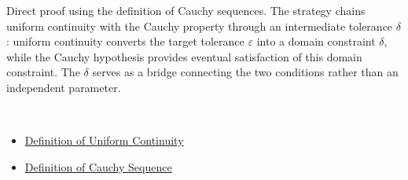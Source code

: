 \begin{remark*}
Direct proof using the definition of Cauchy sequences. The strategy chains uniform continuity with the Cauchy property through an intermediate tolerance $\delta$: uniform continuity converts the target tolerance $\varepsilon$ into a domain constraint $\delta$, while the Cauchy hypothesis provides eventual satisfaction of this domain constraint. The $\delta$ serves as a bridge connecting the two conditions rather than an independent parameter.
\end{remark*}

\begin{remark*}[Dependencies]~\\
\begin{itemize}
  \item \hyperref[def:uniform-continuity]{Definition of Uniform Continuity}
  \item \hyperref[def:cauchy-sequence]{Definition of Cauchy Sequence}
\end{itemize}
\end{remark*}
